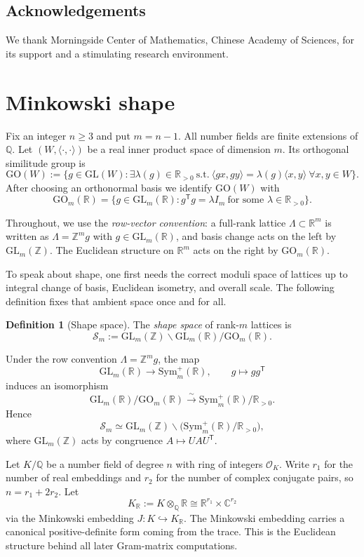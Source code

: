\documentclass[11pt,letterpaper]{amsart}
\newcommand{\Q}{\mathbb{Q}}
\newcommand{\Z}{\mathbb{Z}}
\newcommand{\R}{\mathbb{R}}
\newcommand{\C}{\mathbb{C}}
\newcommand{\cO}{\mathcal{O}}
\newcommand{\GL}{\mathrm{GL}}
\newcommand{\GO}{\mathrm{GO}}
\newcommand{\Sym}{\mathrm{Sym}}
\theoremstyle{plain}
\theoremstyle{definition}
\newtheorem{definition}[theorem]{Definition}
\begin{document}
\subsection*{Acknowledgements}
 We thank Morningside Center of Mathematics, Chinese Academy of Sciences, for its support and a stimulating research environment.

\section{Minkowski shape}\label{sec:minkowski-shape}

Fix an integer $n\ge 3$ and put $m=n-1$. All number fields are finite extensions of $\Q$.
Let $(W,\langle\cdot,\cdot\rangle)$ be a real inner product space of dimension $m$.
Its orthogonal similitude group is
\[
\GO(W):=\{g\in \GL(W): \exists \lambda(g)\in \R_{>0}\ \text{s.t.}\ \langle gx,gy\rangle=\lambda(g)\langle x,y\rangle\ \forall x,y\in W\}.
\]
After choosing an orthonormal basis we identify $\GO(W)$ with
\begin{equation}\label{eq:GOmR}
\GO_m(\R)=\{g\in \GL_m(\R): g^{\mathsf T}g=\lambda I_m \ \text{for some }\lambda\in \R_{>0}\}.
\end{equation}

Throughout, we use the \emph{row-vector convention}: a full-rank lattice $\Lambda\subset \R^m$ is written as
$\Lambda=\Z^m g$ with $g\in \GL_m(\R)$, and basis change acts on the left by $\GL_m(\Z)$.
The Euclidean structure on $\R^m$ acts on the right by $\GO_m(\R)$.

To speak about shape, one first needs the correct moduli space of lattices up to integral change of basis, Euclidean isometry, and overall scale. The following definition fixes that ambient space once and for all.

\begin{definition}[Shape space]\label{def:shape-space}
The \emph{shape space} of rank-$m$ lattices is
\[
\mathscr S_m:=\GL_m(\Z)\backslash \GL_m(\R)/\GO_m(\R).
\]
\end{definition}

Under the row convention $\Lambda=\Z^m g$, the map
\[
\GL_m(\R)\longrightarrow \Sym_m^+(\R),\qquad g\longmapsto gg^{\mathsf T}
\]
induces an isomorphism
\[
\GL_m(\R)/\GO_m(\R)\xrightarrow{\ \sim\ }\Sym_m^+(\R)/\R_{>0}.
\]
Hence
\[
\mathscr S_m \simeq \GL_m(\Z)\backslash \bigl(\Sym_m^+(\R)/\R_{>0}\bigr),
\]
where $\GL_m(\Z)$ acts by congruence $A\mapsto UAU^{\mathsf T}$.

Let $K/\Q$ be a number field of degree $n$ with ring of integers $\cO_K$.
Write $r_1$ for the number of real embeddings and $r_2$ for the number of complex conjugate pairs, so
$n=r_1+2r_2$. Let
\[
K_\R:=K\otimes_\Q \R \cong \R^{r_1}\times \C^{r_2}
\]
via the Minkowski embedding $J:K\hookrightarrow K_\R$. The Minkowski embedding carries a canonical positive-definite form coming from the trace. This is the Euclidean structure behind all later Gram-matrix computations.
\end{document}
